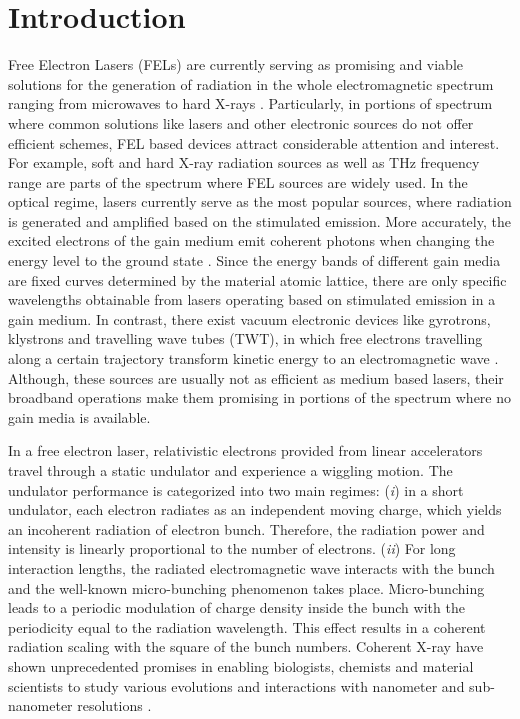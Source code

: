 \chapter{Introduction}
\label{chapter_introduction}

Free Electron Lasers (FELs) are currently serving as promising and viable solutions for the generation of radiation in the whole electromagnetic spectrum ranging from microwaves to hard X-rays \cite{FEL2,FEL1,freund2012principles}.
%
Particularly, in portions of spectrum where common solutions like lasers and other electronic sources do not offer efficient schemes, FEL based devices attract considerable attention and interest.
%
For example, soft and hard X-ray radiation sources as well as THz frequency range are parts of the spectrum where FEL sources are widely used.
%
In the optical regime, lasers currently serve as the most popular sources, where radiation is generated and amplified based on the stimulated emission.
%
More accurately, the excited electrons of the gain medium emit coherent photons when changing the energy level to the ground state \cite{siegman1986lasers}.
%
Since the energy bands of different gain media are fixed curves determined by the material atomic lattice, there are only specific wavelengths obtainable from lasers operating based on stimulated emission in a gain medium.
%
In contrast, there exist vacuum electronic devices like gyrotrons, klystrons and travelling wave tubes (TWT), in which free electrons travelling along a certain trajectory transform kinetic energy to an electromagnetic wave \cite{gilmour1986microwave}.
%
Although, these sources are usually not as efficient as medium based lasers, their broadband operations make them promising in portions of the spectrum where no gain media is available.

In a free electron laser, relativistic electrons provided from linear accelerators travel through a static undulator and experience a wiggling motion.
%
The undulator performance is categorized into two main regimes: (\emph{i}) in a short undulator, each electron radiates as an independent moving charge, which yields an incoherent radiation of electron bunch.
%
Therefore, the radiation power and intensity is linearly proportional to the number of electrons.
%
(\emph{ii}) For long interaction lengths, the radiated electromagnetic wave interacts with the bunch and the well-known micro-bunching phenomenon takes place.
%
Micro-bunching leads to a periodic modulation of charge density inside the bunch with the periodicity equal to the radiation wavelength.
%
This effect results in a coherent radiation scaling with the square of the bunch numbers.
%
Coherent X-ray have shown unprecedented promises in enabling biologists, chemists and material scientists to study various evolutions and interactions with nanometer and sub-nanometer resolutions \cite{jaeschke2015synchrotron}.

